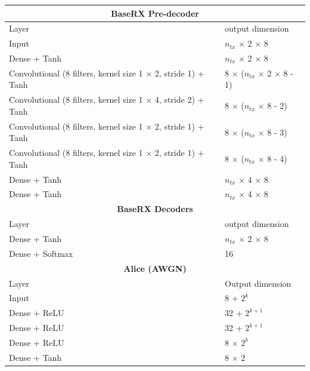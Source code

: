 \begin{table}[bp!]
	\begin{adjustbox}{width=0.9\columnwidth,center}
		\begin{tabular}{|l|l|} 
			\hline
			\multicolumn{2}{|c|}{\textbf{BaseRX Pre-decoder}}															\\
			\hline
			Layer 																	&	output dimension	\\														
			\hline
			Input & \(n_{tx}\) $\times$ 2 $\times$ 8 \\
			Dense + Tanh          													&	\(n_{tx}\) $\times$ 2 $\times$ 8		\\
			Convolutional (8 filters, kernel size 1 $\times$ 2, stride 1) + Tanh 	&   8 $\times$ (\(n_{tx}\) $\times$ 2 $\times$ 8 - 1)		\\
			Convolutional (8 filters, kernel size 1 $\times$ 4, stride 2) + Tanh 	&   8 $\times$ (\(n_{tx}\) $\times$ 8 - 2)		\\
			Convolutional (8 filters, kernel size 1 $\times$ 2, stride 1) + Tanh 	&   8 $\times$ (\(n_{tx}\) $\times$ 8 - 3)		\\
			Convolutional (8 filters, kernel size 1 $\times$ 2, stride 1) + Tanh 	&   8 $\times$ (\(n_{tx}\) $\times$ 8 - 4)		\\
			Dense + Tanh          													&	\(n_{tx}\) $\times$ 4 $\times$ 8		\\
			Dense + Tanh          													&	 \(n_{tx}\) $\times$ 4 $\times$ 8		\\
			\hline
			\hline
			\multicolumn{2}{|c|}{\textbf{BaseRX Decoders}}
			\\
			\hline
			Layer 																	&	output dimension	\\
			\hline
			Dense + Tanh															&	\(n_{tx}\) $\times$ 2 $\times$ 8		\\
			Dense + Softmax															&	16					\\ 
			\hline
			\hline
			\multicolumn{2}{|c|}{\textbf{Alice (AWGN)}} 															\\
			\hline
			Layer 																	&	Output dimension	\\
			\hline
			Input   											&	8 + $2^k$ \\ 
			Dense + ReLU          													&	32 + $2^{k+1}$		\\
			Dense + ReLU          													&	32 + $2^{k+1}$		\\
			Dense + ReLU   															&	8 $\times$ $2^k$	\\
			Dense + Tanh																	&	8 $\times$ 2	\\

\end{tabular}
\end{adjustbox}
\end{table}
